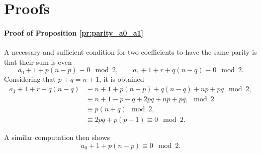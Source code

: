 \documentclass{elsarticle}
\begin{document}
\section{Proofs}\label{app:proofs}

\paragraph{Proof of Proposition \ref{pr:parity_a0_a1}}
A necessary and sufficient condition for two coefficients to have the same parity is that their sum is even
\begin{equation*}
    a_0 + 1 + p(n-p) \equiv 0 \mod{2}, \qquad  a_1 + 1 + r + q(n-q) \equiv 0 \mod{2}.
\end{equation*}
Considering that $p+q=n+1$, it is obtained
\begin{equation}
\begin{aligned}
    a_1 + 1 + r + q(n-q) &\equiv n +1 + p(n-p) + q(n-q) + np + pq \mod{2},\\
            &\equiv n + 1 - p - q + 2pq + np + pq, \mod{2} \\
            &\equiv p(n+q) \mod{2}, \\
            &\equiv 2pq + p(p-1) \equiv 0 \mod{2}.
\end{aligned}
\end{equation}

A similar computation then shows
\begin{equation}
    a_0 + 1 + p(n-p) \equiv 0 \mod{2}.
\end{equation}
\end{document}
